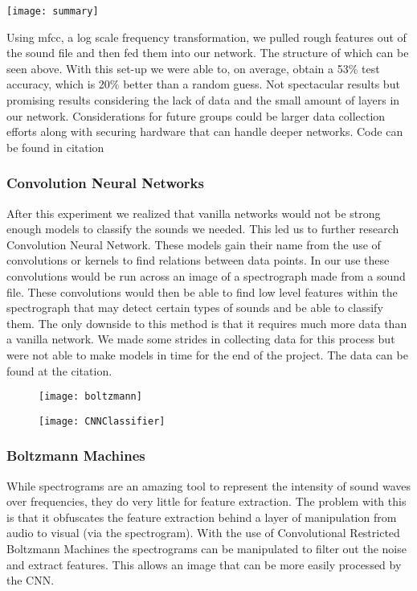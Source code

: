 \begin{center}
	\texttt{[image: summary]}
\end{center}

Using mfcc, a log scale frequency transformation, we pulled rough features out of the sound file and then fed them into our network. The structure of which can be seen above. With this set-up we were able to, on average, obtain a 53\% test accuracy, which is 20\% better than a random guess. Not spectacular results but promising results considering the lack of data and the small amount of layers in our network. Considerations for future groups could be larger data collection efforts along with securing hardware that can handle deeper networks. Code can be found in citation\cite{ot}

\subsubsection{Convolution Neural Networks}
After this experiment we realized that vanilla networks would not be strong enough models to classify the sounds we needed. This led us to further research Convolution Neural Network. These models gain their name from the use of convolutions or kernels to find relations between data points. In our use these convolutions would be run across an image of a spectrograph made from a sound file. These convolutions would then be able to find low level features within the spectrograph that may detect certain types of sounds and be able to classify them. The only downside to this method is that it requires much more data than a vanilla network. We made some strides in collecting data for this process but were not able to make models in time for the end of the project. The data can be found at the citation.\cite{soundData}

\begin{figure}
	\centering
	\begin{minipage}{.5\textwidth}
		\centering
		\texttt{[image: boltzmann]}
		\label{fig:test1}
	\end{minipage}%
	\begin{minipage}{.5\textwidth}
		\centering
		\texttt{[image: CNNClassifier]}
		\label{fig:test2}
	\end{minipage}
\end{figure}

\subsubsection{Boltzmann Machines}
While spectrograms are an amazing tool to represent the intensity of sound waves over frequencies, they do very little for feature extraction. The problem with this is that it obfuscates the feature extraction behind a layer of manipulation from audio to visual (via the spectrogram). With the use of Convolutional Restricted Boltzmann Machines the spectrograms can be manipulated to filter out the noise and extract features. This allows an image that can be more easily processed by the CNN.

